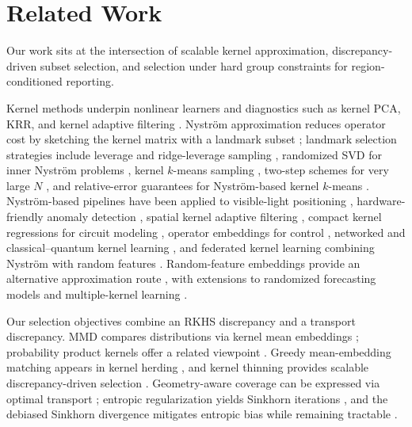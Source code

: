 \documentclass[10pt,journal]{IEEEtran}
\newcommand{\1}{\mathbf{1}}
\theoremstyle{ieeethm}
\begin{document}
\section{Related Work}
\label{sec:related}

Our work sits at the intersection of scalable kernel approximation, discrepancy-driven subset selection, and selection under hard group constraints for region-conditioned reporting.

Kernel methods underpin nonlinear learners and diagnostics such as kernel PCA, KRR, and kernel adaptive filtering \cite{scholkopf2002learning,engel2004krls,liu2010kaf}. Nyström approximation reduces operator cost by sketching the kernel matrix with a landmark subset \cite{williams2001nystrom,gittens2016nystrom}; landmark selection strategies include leverage and ridge-leverage sampling \cite{natoleverage2011,alaoui2015rr}, randomized SVD for inner Nyström problems \cite{Li_Bi_Kwok_2015,golub2013matrix}, kernel $k$-means sampling \cite{he_zhang_2018}, two-step schemes for very large $N$ \cite{he2026twostepnystrom}, and relative-error guarantees for Nyström-based kernel $k$-means \cite{wang2019scalablekkmeans}. Nyström-based pipelines have been applied to visible-light positioning \cite{rekkas2024vlp}, hardware-friendly anomaly detection \cite{aftowicz_fritscher_lehniger_2024}, spatial kernel adaptive filtering \cite{liu_farahani_li_xie_2025}, compact kernel regressions for circuit modeling \cite{atlante_trinchero_stievano_mihai_2025}, operator embeddings for control \cite{ren_ren_ma_li_dai_2025}, networked and classical--quantum kernel learning \cite{afaq_muhammad_2025}, and federated kernel learning combining Nyström with random features \cite{zhang_li_yin_wang_2026}. Random-feature embeddings provide an alternative approximation route \cite{rahimi2007random,rudi2017randomfeatures}, with extensions to randomized forecasting models \cite{seman_klaar_ribeiro_stefenon_2025} and multiple-kernel learning \cite{pinar_rice_hi_anderson_havens_2017}.

Our selection objectives combine an RKHS discrepancy and a transport discrepancy. MMD compares distributions via kernel mean embeddings \cite{gretton2012kernel,smola2007hilbert,sriperumbudur2010hilbert,muandet2017kernel}; probability product kernels offer a related viewpoint \cite{jebara2004ppk}. Greedy mean-embedding matching appears in kernel herding \cite{chen2010herding}, and kernel thinning provides scalable discrepancy-driven selection \cite{dwivedi2024kernelthinning}. Geometry-aware coverage can be expressed via optimal transport \cite{villani2009ot,peyre2019ot}; entropic regularization yields Sinkhorn iterations \cite{cuturi2013sinkhorn}, and the debiased Sinkhorn divergence mitigates entropic bias while remaining tractable \cite{feydy2019sinkhorn}.
\end{document}
